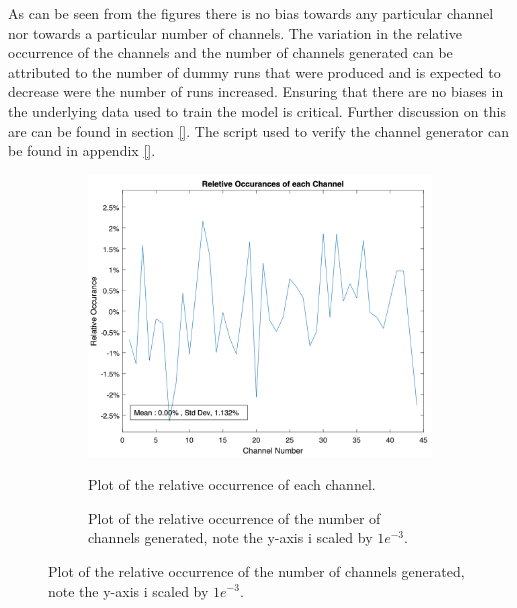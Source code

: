 As can be seen from the figures there is no bias towards any particular channel nor towards a particular number of channels. The variation in the relative occurrence of the channels and the number of channels generated can be attributed to the number of dummy runs that were produced and is expected to decrease were the number of runs increased. Ensuring that there are no biases in the underlying data used to train the model is critical. Further discussion on this are can be found in section \ref{}. The script used to verify the channel generator can be found in appendix \ref{}.
\begin{figure}
    \centering
    \caption{Results of 5000 dummy runs of the channel generator.}
    \label{fig:tw:dummy_runs}
    \begin{subfigure}{0.49\textwidth}
        \centering
    \caption{Plot of the relative occurrence of each channel.}
    \includegraphics[width=\textwidth]{images/technical_work/section_2_data generation/rel_occur_ch.png}
    \label{fig:tw:data_gen:rel_ch}    
    \end{subfigure}
    \begin{subfigure}{0.49\textwidth}
        \centering
        \caption{Plot of the relative occurrence of the number of channels generated, note the y-axis i scaled by $1e^{-3}$.}

\end{subfigure}
\end{figure}

